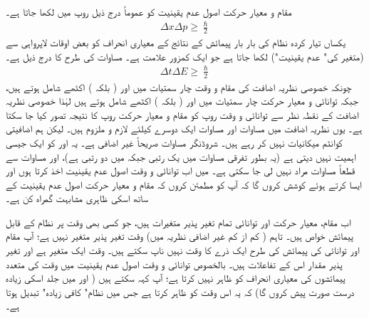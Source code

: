 مقام و معیار حرکت اصول عدم یقینیت کو عموماً درج ذیل روپ میں لکھا جاتا ہے۔
\begin{align}\label{مساوات_قواعد_اصول_مقام_و_معیار_حرکت_عدم_یقینیت}
\Delta x \Delta p \geq \frac{\hslash}{2} 
\end{align}
یکساں تیار کردہ نظام کی بار بار پیمائش کے نتائج کے معیاری انحراف کو بعض اوقات لاپرواہی سے  (متغیر  کی" عدم یقینیت") لکھا جاتا ہے جو ایک کمزور علامت ہے۔ مساوات  کی طرح کا  درج ذیل ہے۔
\begin{align}\label{مساوات_قواعد_اصول_وقت_و_توانائی_عدم_یقینیت}
\Delta t \Delta E \geq \frac{\hslash}{2}
\end{align}
چونکہ خصوصی نظریہ اضافت کی مقام و وقت چار سمتیات میں  اور  ( بلکہ ) اکٹھے شامل ہوتے ہیں، جبکہ توانائی و معیار حرکت چار سمتیات میں  اور  ( بلکہ ) اکٹھے شامل ہوتے ہیں لہٰذا خصوصی نظریہ اضافت کے نقطہ نظر سے توانائی و وقت روپ کو مقام و معیار حرکت روپ کا نتیجہ تصور کیا جا سکتا ہے۔ یوں نظریہ اضافت میں مساوات  اور مساوات  ایک دوسرے کیلئے لازم و ملزوم ہیں۔ لیکن ہم اضافیتی کوانٹم میکانیات نہیں کر رہے ہیں۔ شروڈنگر مساوات صریحاً غیر اضافی ہے۔ یہ  اور  کو ایک جیسی اہمیت نہیں دیتی ہے (یہ بطور تفرقی مساوات  میں یک رتبی جبکہ  میں دو رتبی ہے)، اور
 مساوات  سے قطعاً مساوات  مراد نہیں لی جا سکتی ہے۔ میں اب توانائی و وقت اصول عدم یقینیت اخذ کرتا ہوں اور ایسا کرتے ہوئے کوشش کروں گا کہ آپ کو مطمئن کروں کہ مقام و معیار حرکت اصول عدم یقینیت کے ساتھ اسکی ظاہری مشابہت گمراہ کن ہے۔
 
اب مقام، معیار حرکت اور توانائی تمام تغیر پذیر متغیرات ہیں، جو کسی بھی وقت پر نظام کے قابل پیمائش خواص ہیں۔ تاہم ( کم از کم غیر اضافی نظریہ میں) وقت تغیر پذیر متغیر نہیں ہے؛ آپ مقام اور توانائی کی پیمائش کی طرح ایک ذرے کا وقت نہیں ناپ سکتے ہیں۔ وقت ایک  متغیر ہے اور تغیر پذیر مقدار اس کے تفاعلات ہیں۔ بالخصوص توانائی و وقت اصول عدم یقینیت میں وقت کی متعدد پیمائشوں کی معیاری انحراف کو  ظاہر نہیں کرتا ہے؛ آپ کہہ سکتے ہیں ( اور میں جلد اسکی زیادہ درست صورت پیش کروں گا) کہ یہ اس وقت کو ظاہر کرتا ہے جس میں نظام" کافی زیادہ" تبدیل ہوتا ہے۔

